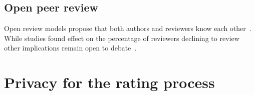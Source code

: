 \subsection*{Open peer review}

Open review models propose that both authors and reviewers know each
other~\cite{ford2013defining}. While studies found effect on the percentage of
reviewers declining to review~\cite{van1999effect} other implications remain
open to debate~\cite{groves2010open}.







\section{Privacy for the rating process}
\label{sec:privacyRating}


